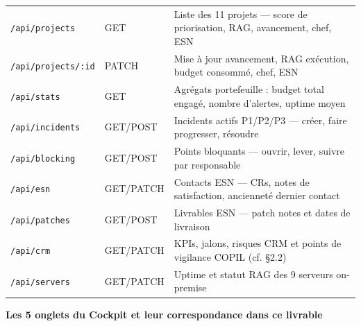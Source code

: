 \documentclass[11pt,a4paper,oneside]{report}
\begin{document}
\vspace{4pt}
\begin{center}
\renewcommand{\arraystretch}{1.5}
\begin{tabularx}{\textwidth}{L{4cm} C{2cm} L{8cm}}
\toprule
{}
 &  &  \\
\midrule
\texttt{/api/projects}       & GET   & Liste des 11 projets — score de priorisation, RAG, avancement, chef, ESN \\
\texttt{/api/projects/:id}   & PATCH & Mise à jour avancement, RAG exécution, budget consommé, chef, ESN \\
\texttt{/api/stats}          & GET   & Agrégats portefeuille : budget total engagé, nombre d'alertes, uptime moyen \\
\texttt{/api/incidents}      & GET/POST & Incidents actifs P1/P2/P3 — créer, faire progresser, résoudre \\
\texttt{/api/blocking}       & GET/POST & Points bloquants — ouvrir, lever, suivre par responsable \\
\texttt{/api/esn}            & GET/PATCH & Contacts ESN — CRs, notes de satisfaction, ancienneté dernier contact \\
\texttt{/api/patches}        & GET/POST & Livrables ESN — patch notes et dates de livraison \\
\texttt{/api/crm}            & GET/PATCH & KPIs, jalons, risques CRM et points de vigilance COPIL (cf. §2.2) \\
\texttt{/api/servers}        & GET/PATCH & Uptime et statut RAG des 9 serveurs on-premise \\
\bottomrule
\end{tabularx}
\end{center}

\textbf{Les 5 onglets du Cockpit et leur correspondance dans ce livrable}
\end{document}
